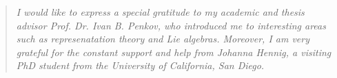 \documentclass[10pt,a4paper]{article}
\begin{document}


\renewcommand{\abstractname}{\begin{Large}Acknowledgements\end{Large}}
\begin{abstract}
\begin{large}
\textit{
I would like to express a special gratitude to my academic and thesis advisor Prof. Dr. Ivan B. Penkov, who introduced me to interesting areas such as represenatation theory and Lie algebras.   Moreover, I am very grateful for the constant support and help from Johanna Hennig, a visiting PhD student from  the University of California, San Diego.}
\end{large}
\end{abstract}

\thispagestyle{empty}
\newpage
\tableofcontents{}
\thispagestyle{empty}
\newpage
\pagestyle{headings}
\newpage
\setcounter{page}{1}



\newpage
\medskip

\printbibliography
\end{document}

